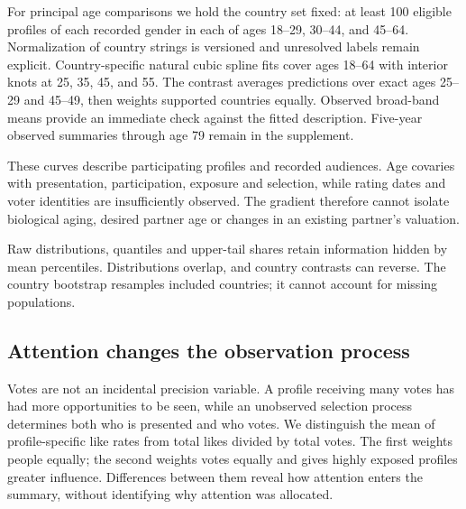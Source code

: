 For principal age comparisons we hold the country set fixed: at least 100 eligible profiles of each recorded gender in each of ages 18--29, 30--44, and 45--64. Normalization of country strings is versioned and unresolved labels remain explicit. Country-specific natural cubic spline fits cover ages 18--64 with interior knots at 25, 35, 45, and 55. The contrast averages predictions over exact ages 25--29 and 45--49, then weights supported countries equally. Observed broad-band means provide an immediate check against the fitted description. Five-year observed summaries through age 79 remain in the supplement.


These curves describe participating profiles and recorded audiences. Age covaries with presentation, participation, exposure and selection, while rating dates and voter identities are insufficiently observed. The gradient therefore cannot isolate biological aging, desired partner age or changes in an existing partner's valuation.

Raw distributions, quantiles and upper-tail shares retain information hidden by mean percentiles. Distributions overlap, and country contrasts can reverse. The country bootstrap resamples included countries; it cannot account for missing populations.

\subsection{Attention changes the observation process}

Votes are not an incidental precision variable. A profile receiving many votes has had more opportunities to be seen, while an unobserved selection process determines both who is presented and who votes. We distinguish the mean of profile-specific like rates from total likes divided by total votes. The first weights people equally; the second weights votes equally and gives highly exposed profiles greater influence. Differences between them reveal how attention enters the summary, without identifying why attention was allocated.

